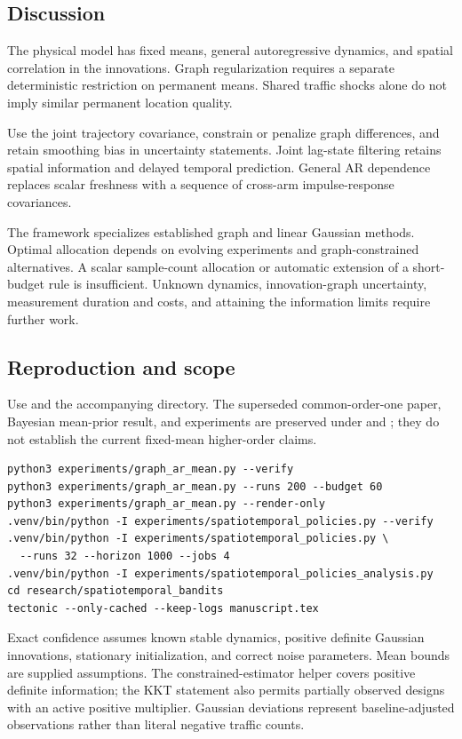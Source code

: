 \subsection{Discussion}
The physical model has fixed means, general autoregressive dynamics, and spatial correlation in the innovations. Graph regularization requires a separate deterministic restriction on permanent means. Shared traffic shocks alone do not imply similar permanent location quality.

Use the joint trajectory covariance, constrain or penalize graph differences, and retain smoothing bias in uncertainty statements. Joint lag-state filtering retains spatial information and delayed temporal prediction. General AR dependence replaces scalar freshness with a sequence of cross-arm impulse-response covariances.

The framework specializes established graph and linear Gaussian methods. Optimal allocation depends on evolving experiments and graph-constrained alternatives. A scalar sample-count allocation or automatic extension of a short-budget rule is insufficient. Unknown dynamics, innovation-graph uncertainty, measurement duration and costs, and attaining the information limits require further work.


\subsection{Reproduction and scope}
Use  and the accompanying  directory. The superseded common-order-one paper, Bayesian mean-prior result, and experiments are preserved under  and ; they do not establish the current fixed-mean higher-order claims.
\begin{verbatim}
python3 experiments/graph_ar_mean.py --verify
python3 experiments/graph_ar_mean.py --runs 200 --budget 60
python3 experiments/graph_ar_mean.py --render-only
.venv/bin/python -I experiments/spatiotemporal_policies.py --verify
.venv/bin/python -I experiments/spatiotemporal_policies.py \
  --runs 32 --horizon 1000 --jobs 4
.venv/bin/python -I experiments/spatiotemporal_policies_analysis.py
cd research/spatiotemporal_bandits
tectonic --only-cached --keep-logs manuscript.tex
\end{verbatim}
Exact confidence assumes known stable dynamics, positive definite Gaussian innovations, stationary initialization, and correct noise parameters. Mean bounds are supplied assumptions. The constrained-estimator helper covers positive definite information; the KKT statement also permits partially observed designs with an active positive multiplier. Gaussian deviations represent baseline-adjusted observations rather than literal negative traffic counts.

